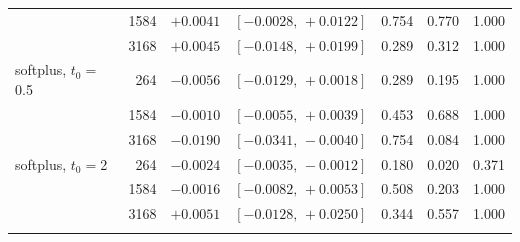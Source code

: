 {\begin{tabular}{@{}lrrcrrr@{}}
 & 1584 & $+0.0041$ & $[-0.0028,\,+0.0122]$ & 0.754 & 0.770 & 1.000 \\
 & 3168 & $+0.0045$ & $[-0.0148,\,+0.0199]$ & 0.289 & 0.312 & 1.000 \\
\addlinespace[2pt]
softplus, $t_0{=}$0.5 & 264 & $-0.0056$ & $[-0.0129,\,+0.0018]$ & 0.289 & 0.195 & 1.000 \\
 & 1584 & $-0.0010$ & $[-0.0055,\,+0.0039]$ & 0.453 & 0.688 & 1.000 \\
 & 3168 & $-0.0190$ & $[-0.0341,\,-0.0040]$ & 0.754 & 0.084 & 1.000 \\
\addlinespace[2pt]
softplus, $t_0{=}$2 & 264 & $-0.0024$ & $[-0.0035,\,-0.0012]$ & 0.180 & 0.020 & 0.371 \\
 & 1584 & $-0.0016$ & $[-0.0082,\,+0.0053]$ & 0.508 & 0.203 & 1.000 \\
 & 3168 & $+0.0051$ & $[-0.0128,\,+0.0250]$ & 0.344 & 0.557 & 1.000 \\
\addlinespace[2pt]
\bottomrule
\end{tabular}
}

